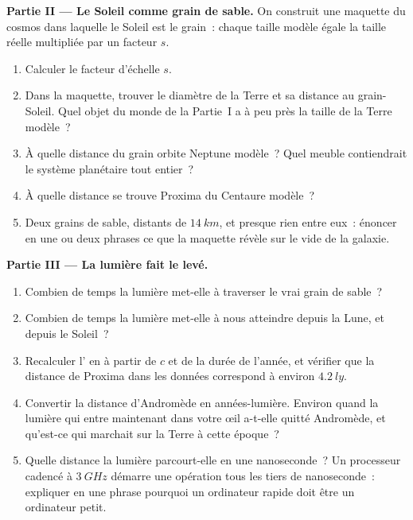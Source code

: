 \begin{problem}
\medskip
\noindent\textbf{Partie II --- Le Soleil comme grain de sable.}
On construit une maquette du cosmos dans laquelle le Soleil est le
grain~: chaque taille modèle égale la taille réelle multipliée par un
facteur $s$.
\begin{enumerate}[resume]
  \item Calculer le facteur d'échelle $s$.
  \item Dans la maquette, trouver le diamètre de la Terre et sa
        distance au grain-Soleil. Quel objet du monde de la Partie~I
        a à peu près la taille de la Terre modèle~?
  \item À quelle distance du grain orbite Neptune modèle~? Quel meuble
        contiendrait le système planétaire tout entier~?
  \item À quelle distance se trouve Proxima du Centaure modèle~?
  \item Deux grains de sable, distants de $\qty{14}{km}$, et presque
        rien entre eux~: énoncer en une ou deux phrases ce que la
        maquette révèle sur le vide de la galaxie.
\end{enumerate}

\medskip
\noindent\textbf{Partie III --- La lumière fait le levé.}
\begin{enumerate}[resume]
  \item Combien de temps la lumière met-elle à traverser le vrai grain
        de sable~?
  \item Combien de temps la lumière met-elle à nous atteindre depuis
        la Lune, et depuis le Soleil~?
  \item Recalculer l' en  à partir de $c$ et
        de la durée de l'année, et vérifier que la distance de Proxima
        dans les données correspond à environ $\qty{4.2}{ly}$.
  \item Convertir la distance d'Andromède en années-lumière.
        Environ quand la lumière qui entre maintenant dans votre œil a-t-elle
        quitté Andromède, et qu'est-ce qui marchait sur la Terre à
        cette époque~?
  \item Quelle distance la lumière parcourt-elle en une nanoseconde~?
        Un processeur cadencé à $\qty{3}{GHz}$ démarre une opération
        tous les tiers de nanoseconde~: expliquer en une phrase
        pourquoi un ordinateur rapide doit être un ordinateur petit.
\end{enumerate}


\end{problem}
